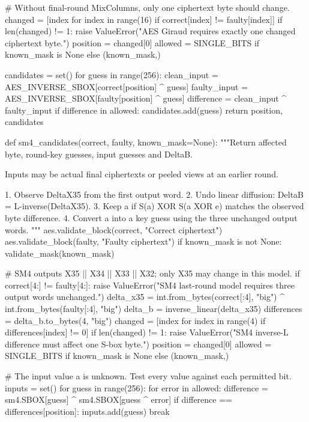 \begin{lightcode}[numbers=left,firstnumber=1]
    # Without final-round MixColumns, only one ciphertext byte should change.
    changed = [index for index in range(16) if correct[index] != faulty[index]]
    if len(changed) != 1:
        raise ValueError("AES Giraud requires exactly one changed ciphertext byte.")
    position = changed[0]
    allowed = SINGLE_BITS if known_mask is None else (known_mask,)

    candidates = set()
    for guess in range(256):
        clean_input = AES_INVERSE_SBOX[correct[position] ^ guess]
        faulty_input = AES_INVERSE_SBOX[faulty[position] ^ guess]
        difference = clean_input ^ faulty_input
        if difference in allowed:
            candidates.add(guess)
    return position, candidates


def sm4_candidates(correct, faulty, known_mask=None):
    """Return affected byte, round-key guesses, input guesses and DeltaB.

    Inputs may be actual final ciphertexts or peeled views at an earlier round.

    1. Observe DeltaX35 from the first output word.
    2. Undo linear diffusion: DeltaB = L-inverse(DeltaX35).
    3. Keep a if S(a) XOR S(a XOR e) matches the observed byte difference.
    4. Convert a into a key guess using the three unchanged output words.
    """
    aes.validate_block(correct, "Correct ciphertext")
    aes.validate_block(faulty, "Faulty ciphertext")
    if known_mask is not None:
        validate_mask(known_mask)

    # SM4 outputs X35 || X34 || X33 || X32; only X35 may change in this model.
    if correct[4:] != faulty[4:]:
        raise ValueError("SM4 last-round model requires three output words unchanged.")
    delta_x35 = int.from_bytes(correct[:4], "big") ^ int.from_bytes(faulty[:4], "big")
    delta_b = inverse_linear(delta_x35)
    differences = delta_b.to_bytes(4, "big")
    changed = [index for index in range(4) if differences[index] != 0]
    if len(changed) != 1:
        raise ValueError("SM4 inverse-L difference must affect one S-box byte.")
    position = changed[0]
    allowed = SINGLE_BITS if known_mask is None else (known_mask,)

    # The input value a is unknown. Test every value against each permitted bit.
    inputs = set()
    for guess in range(256):
        for error in allowed:
            difference = sm4.SBOX[guess] ^ sm4.SBOX[guess ^ error]
            if difference == differences[position]:
                inputs.add(guess)
                break


\end{lightcode}
